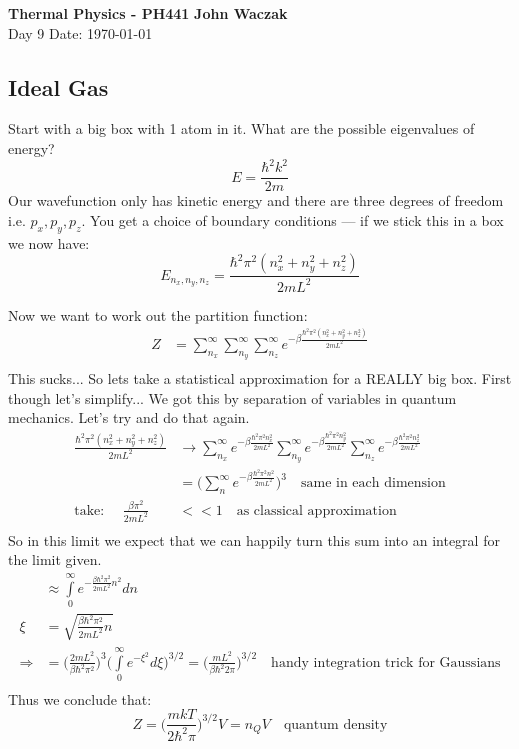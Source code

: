 \documentclass[a4paper, 11pt]{article}
\begin{document}
\noindent
\large\textbf{Thermal Physics - PH441} \hfill \textbf{John Waczak} \\
\normalsize Day 9 \hfill  Date: \today \\

\subsection*{Ideal Gas}
Start with a big box with 1 atom in it. What are the possible eigenvalues of energy? 
	\begin{equation*}
		E = \frac{\hbar^2k^2}{2m} 
	\end{equation*}
Our wavefunction only has kinetic energy and there are three degrees of freedom i.e. $p_x, p_y, p_z$. You get a choice of boundary conditions --- if we stick this in a box we now have: 
	\begin{equation*}
		E_{n_x, n_y,n_z} = \frac{\hbar^2\pi^2(n_x^2+n_y^2+n_z^2)}{2mL^2}
	\end{equation*}

\noindent Now we want to work out the partition function: 
	\begin{align*}
		Z &= \sum\limits_{n_x}^\infty \sum\limits_{n_y}^\infty \sum\limits_{n_z}^\infty e^{-\beta\frac{\hbar^2\pi^2(n_x^2+n_y^2+n_z^2)}{2mL^2}} \\ 
	\end{align*}
This sucks... So lets take a statistical approximation for a REALLY big box. First though let's simplify... We got this by separation of variables in quantum mechanics. Let's try and do that again. 
	\begin{align*}
		\frac{\hbar^2\pi^2(n_x^2+n_y^2+n_z^2)}{2mL^2} &\rightarrow \sum\limits_{n_x}^\infty e^{-\beta \frac{\hbar^2\pi^2n_x^2}{2mL^2}}\sum\limits_{n_y}^\infty e^{-\beta \frac{\hbar^2\pi^2n_y^2}{2mL^2}}\sum\limits_{n_z}^\infty e^{-\beta \frac{\hbar^2\pi^2n_z^2}{2mL^2}} \\ 
		&= \Big(\sum\limits_n^\infty e^{-\beta\frac{\hbar^2\pi^2n^2}{2mL^2}}\Big)^3 \quad \text{same in each dimension} \\ 
		\text{take: } \quad \frac{\beta \pi^2}{2mL^2}&<< 1 \quad \text{as classical approximation} \\  
	\end{align*}
So in this limit we expect that we can happily turn this sum into an integral for the limit given. 
	\begin{align*}
		&\approx \int\limits_0^\infty e^{-\frac{\beta\hbar^2\pi^2}{2mL^2}n^2}dn  \\ 
		\xi &= \sqrt{\frac{\beta\hbar^2\pi^2}{2mL^2}n} \\ 
		\Rightarrow &= \Big(\frac{2mL^2}{\beta\hbar^2\pi^2} \Big)^3\Big(\int\limits_0^\infty e^{-\xi^2}d\xi\Big)^{3/2} = \Big(\frac{mL^2}{\beta\hbar^2 2 \pi} \Big)^{3/2}\quad \text{handy integration trick for Gaussians}\\ 
	\end{align*}
Thus we conclude that: 
	\begin{equation*}
		Z = \Big(\frac{mkT}{2\hbar^2\pi}\Big)^{3/2}V = n_Q V\quad \text{quantum density}
	\end{equation*}
	
\end{document}
